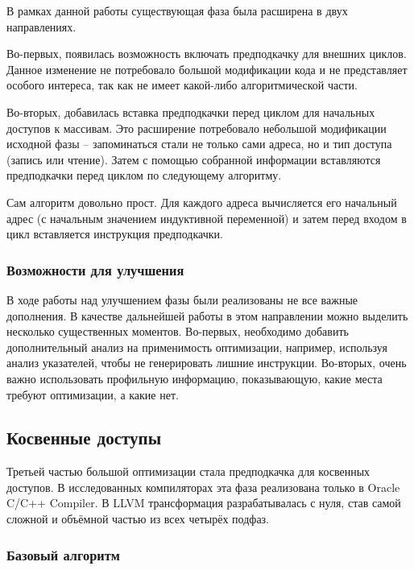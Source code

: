 \documentclass[12pt,a4paper]{article}
\begin{document}
\indent

В рамках данной работы существующая фаза была расширена в двух направлениях.

Во-первых, появилась возможность включать предподкачку для внешних циклов. Данное изменение не потребовало большой модификации кода и не представляет особого интереса, так как не имеет какой-либо алгоритмической части.

Во-вторых, добавилась вставка предподкачки перед циклом для начальных доступов к массивам. Это расширение потребовало небольшой модификации исходной фазы -- запоминаться стали не только сами адреса, но и тип доступа (запись или чтение). Затем с помощью собранной информации вставляются предподкачки перед циклом по следующему алгоритму.



Сам алгоритм довольно прост. Для каждого адреса вычисляется его начальный адрес (с начальным значением индуктивной переменной) и затем перед входом в цикл вставляется инструкция предподкачки.

\subsubsection{Возможности для улучшения}

\indent

В ходе работы над улучшением фазы были реализованы не все важные дополнения. В качестве дальнейшей работы в этом направлении можно выделить несколько существенных моментов. Во-первых, необходимо добавить дополнительный анализ на применимость оптимизации, например, используя анализ указателей, чтобы не генерировать лишние инструкции. Во-вторых, очень важно использовать профильную информацию, показывающую, какие места требуют оптимизации, а какие нет.

\subsection{Косвенные доступы}

\indent

Третьей частью большой оптимизации стала предподкачка для косвенных доступов. В исследованных компиляторах эта фаза реализована только в Oracle C/C++ Compiler. В LLVM трансформация разрабатывалась с нуля, став самой сложной и объёмной частью из всех четырёх подфаз.

\subsubsection{Базовый алгоритм}
\end{document}
